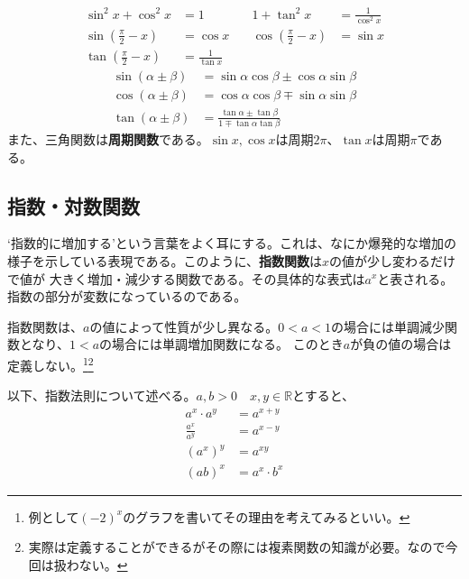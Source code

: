 \documentclass[a4j,dvipdfmx]{jsarticle}
\begin{document}
                \begin{align}
                    \sin^2 x + \cos ^2 x &= 1 &\quad 1 + \tan^2 x &= \frac{1}{\cos^2 x}\\
                    \sin\left(\frac{\pi}{2}-x\right) &= \cos x &\quad \cos\left(\frac{\pi}{2}-x\right) &= \sin x\\
                    \tan\left(\frac{\pi}{2}-x\right) &= \frac{1}{\tan x} &&
                \end{align}
                \begin{align}
                    \sin(\alpha\pm\beta) &= \sin\alpha\cos\beta \pm \cos\alpha\sin\beta\\
                    \cos(\alpha\pm\beta) &= \cos\alpha\cos\beta \mp \sin\alpha\sin\beta\\
                    \tan(\alpha\pm\beta) &= \frac{\tan\alpha\pm\tan\beta}{1\mp\tan\alpha\tan\beta}
                \end{align}
                また、三角関数は\textbf{周期関数}である。$\sin x,\cos x$は周期$2\pi$、$\tan x$は周期$\pi$である。
            \clearpage
            \subsection{指数・対数関数}
                `指数的に増加する'という言葉をよく耳にする。これは、なにか爆発的な増加の様子を示している表現である。このように、\textbf{指数関数}は$x$の値が少し変わるだけで値が
                大きく増加・減少する関数である。その具体的な表式は$a^x$と表される。指数の部分が変数になっているのである。

                指数関数は、$a$の値によって性質が少し異なる。$0<a<1$の場合には単調減少関数となり、$1<a$の場合には単調増加関数になる。
                このとき$a$が負の値の場合は定義しない。\footnote{例として$(-2)^x$のグラフを書いてその理由を考えてみるといい。}\footnote{実際は定義することができるがその際には複素関数の知識が必要。なので今回は扱わない。}

                以下、指数法則について述べる。$a,b>0\quad x,y\in \mathbb{R}$とすると、
                \begin{align}
                    a^x\cdot a^y&=a^{x+y}\\
                    \frac{a^x}{a^y} &= a^{x-y}\\
                    (a^x)^y &= a^{xy}\\
                    (ab)^{x} &= a^x\cdot b^x
                \end{align}
\end{document}
